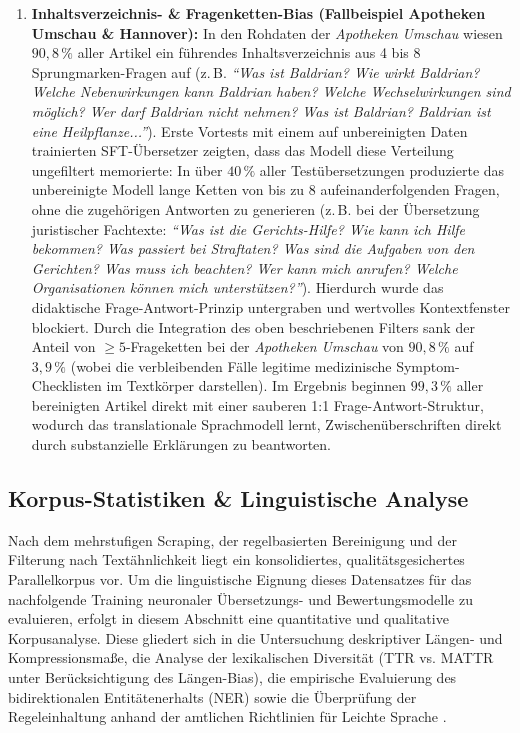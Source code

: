\begin{enumerate}
    \item \textbf{Inhaltsverzeichnis- \& Fragenketten-Bias (Fallbeispiel Apotheken Umschau \& Hannover):} In den Rohdaten der \textit{Apotheken Umschau} wiesen $90{,}8\,\%$ aller Artikel ein führendes Inhaltsverzeichnis aus 4 bis 8 Sprungmarken-Fragen auf (z.\,B. \textit{\enquote{Was ist Baldrian? Wie wirkt Baldrian? Welche Nebenwirkungen kann Baldrian haben? Welche Wechselwirkungen sind möglich? Wer darf Baldrian nicht nehmen? Was ist Baldrian? Baldrian ist eine Heilpflanze...}}). Erste Vortests mit einem auf unbereinigten Daten trainierten SFT-Übersetzer zeigten, dass das Modell diese Verteilung ungefiltert memorierte: In über $40\,\%$ aller Testübersetzungen produzierte das unbereinigte Modell lange Ketten von bis zu 8 aufeinanderfolgenden Fragen, ohne die zugehörigen Antworten zu generieren (z.\,B. bei der Übersetzung juristischer Fachtexte: \textit{\enquote{Was ist die Gerichts-Hilfe? Wie kann ich Hilfe bekommen? Was passiert bei Straftaten? Was sind die Aufgaben von den Gerichten? Was muss ich beachten? Wer kann mich anrufen? Welche Organisationen können mich unterstützen?}}). Hierdurch wurde das didaktische Frage-Antwort-Prinzip untergraben und wertvolles Kontextfenster blockiert. Durch die Integration des oben beschriebenen Filters sank der Anteil von $\ge 5$-Frageketten bei der \textit{Apotheken Umschau} von $90{,}8\,\%$ auf $3{,}9\,\%$ (wobei die verbleibenden Fälle legitime medizinische Symptom-Checklisten im Textkörper darstellen). Im Ergebnis beginnen $99{,}3\,\%$ aller bereinigten Artikel direkt mit einer sauberen 1:1 Frage-Antwort-Struktur, wodurch das translationale Sprachmodell lernt, Zwischenüberschriften direkt durch substanzielle Erklärungen zu beantworten.
\end{enumerate}

\subsection{Korpus-Statistiken \& Linguistische Analyse}
\label{sec:korpus_statistiken_diversitaet}

Nach dem mehrstufigen Scraping, der regelbasierten Bereinigung und der Filterung nach Textähnlichkeit liegt ein konsolidiertes, qualitätsgesichertes Parallelkorpus vor. Um die linguistische Eignung dieses Datensatzes für das nachfolgende Training neuronaler Übersetzungs- und Bewertungsmodelle zu evaluieren, erfolgt in diesem Abschnitt eine quantitative und qualitative Korpusanalyse. Diese gliedert sich in die Untersuchung deskriptiver Längen- und Kompressionsmaße, die Analyse der lexikalischen Diversität (TTR vs. MATTR unter Berücksichtigung des Längen-Bias), die empirische Evaluierung des bidirektionalen Entitätenerhalts (NER) sowie die Überprüfung der Regeleinhaltung anhand der amtlichen Richtlinien für Leichte Sprache \citep{bmas2025ratgeber}.

